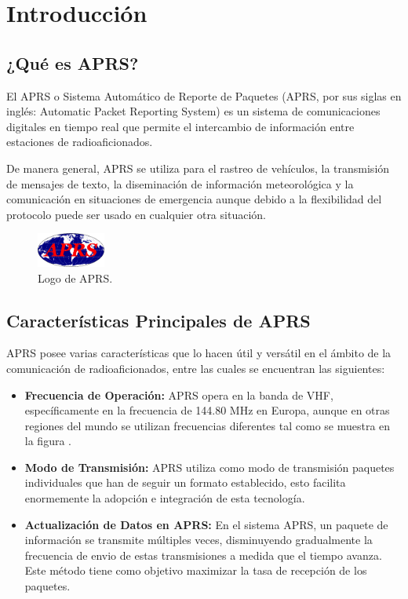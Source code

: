 \chapter{Introducción}
\label{cap:introduccion}

\section{¿Qué es APRS?}

El APRS o Sistema Automático de Reporte de Paquetes (APRS, por sus siglas en inglés: Automatic Packet Reporting System) es un sistema de comunicaciones digitales en tiempo real que permite el intercambio de información entre estaciones de radioaficionados.

De manera general, APRS se utiliza para el rastreo de vehículos, la transmisión de mensajes de texto, la diseminación de información meteorológica y la comunicación en situaciones de emergencia aunque debido a la flexibilidad del protocolo puede ser usado en cualquier otra situación.

\begin{figure}[h!]
	\centering
	\includegraphics[width=0.2\textwidth]{Imagenes//Chapter_1/APRS_logo.png}
	\caption{Logo de APRS.}
	\label{fig:aprs-logo}
\end{figure}

\section{Características Principales de APRS}

APRS posee varias características que lo hacen útil y versátil en el ámbito de la comunicación de radioaficionados, entre las cuales se encuentran las siguientes:
\begin{itemize}
	\item \textbf{Frecuencia de Operación:} APRS opera en la banda de VHF, específicamente en la frecuencia de 144.80 MHz en Europa, aunque en otras regiones del mundo se utilizan frecuencias diferentes tal como se muestra en la figura .
	\item \textbf{Modo de Transmisión:} APRS utiliza como modo de transmisión paquetes individuales que han de seguir un formato establecido, esto facilita enormemente la adopción e integración de esta tecnología.
	\item \textbf{Actualización de Datos en APRS:} En el sistema APRS, un paquete de información se transmite múltiples veces, disminuyendo gradualmente la frecuencia de envio de estas transmisiones a medida que el tiempo avanza. Este método tiene como objetivo maximizar la tasa de recepción de los paquetes.
\end{itemize}

